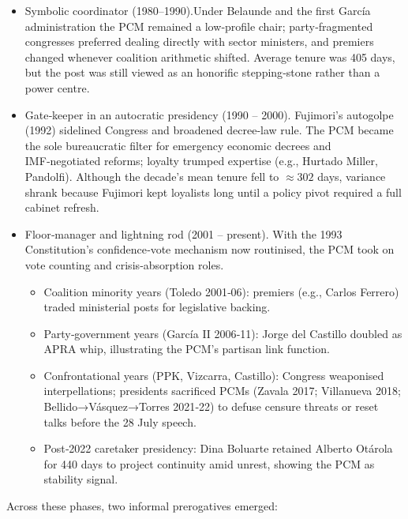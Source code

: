 \documentclass[a4paper, 12pt]{article}
\begin{document}
\begin{itemize}

\item Symbolic coordinator (1980–1990).Under Belaunde and the first García administration the PCM remained a low‑profile chair; party‑fragmented congresses preferred dealing directly with sector ministers, and premiers changed whenever coalition arithmetic shifted.  Average tenure was 405 days, but the post was still viewed as an honorific stepping‑stone rather than a power centre.

\item Gate‑keeper in an autocratic presidency (1990 – 2000). Fujimori’s autogolpe (1992) sidelined Congress and broadened decree‑law rule.  The PCM became the sole bureaucratic filter for emergency economic decrees and IMF‑negotiated reforms; loyalty trumped expertise (e.g., Hurtado Miller, Pandolfi).  Although the decade’s mean tenure fell to $\approx 302$ days, variance shrank because Fujimori kept loyalists long until a policy pivot required a full cabinet refresh.

\item Floor‑manager and lightning rod (2001 – present). With the 1993 Constitution’s confidence‑vote mechanism now routinised, the PCM took on vote counting and crisis‑absorption roles.

\begin{itemize}

\item Coalition minority years (Toledo 2001‑06): premiers (e.g., Carlos Ferrero) traded ministerial posts for legislative backing.  

\item Party‑government years (García II 2006‑11): Jorge del Castillo doubled as APRA whip, illustrating the PCM’s partisan link function.  
\item Confrontational years (PPK, Vizcarra, Castillo): Congress weaponised interpellations; presidents sacrificed PCMs (Zavala 2017; Villanueva 2018; Bellido→Vásquez→Torres 2021‑22) to defuse censure threats or reset talks before the 28 July speech.  

\item Post‑2022 caretaker presidency: Dina Boluarte retained Alberto Otárola for 440 days to project continuity amid unrest, showing the PCM as stability signal.
\end{itemize}
\end{itemize}


Across these phases, two informal prerogatives emerged:
\end{document}
